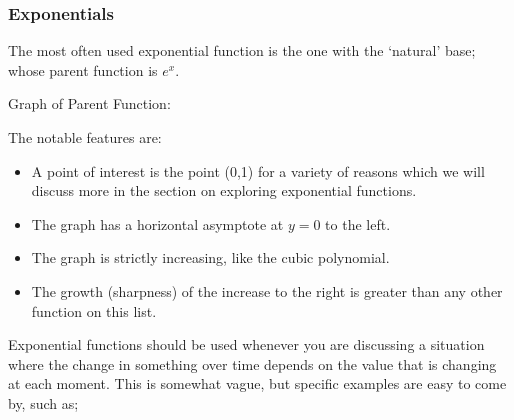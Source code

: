 \documentclass{ximeraXloud}
\begin{document}
    
    
    
    
    \subsubsection*{Exponentials}
    
        \begin{description}
            \item[Parent Function:] The most often used exponential function is the one with the `natural' base; whose parent function is $e^x$.\\
            \begin{minipage}{\textwidth}\item[Graph of Parent Function:]\hspace*{0pt} \\
                \begin{center}
                \end{center}
            \end{minipage}
            \item[Notable Features of Graph:] The notable features are:
            \begin{itemize}
                \item A point of interest is the point (0,1) for a variety of reasons which we will discuss more in the section on exploring exponential functions.
                \item The graph has a horizontal asymptote at $y=0$ to the left.
                \item The graph is strictly increasing, like the cubic polynomial.
                \item The growth (sharpness) of the increase to the right is greater than any other function on this list.
            \end{itemize}
            \item[Example usage:] Exponential functions should be used whenever you are discussing a situation where the change in something over time depends on the value that is changing at each moment. This is somewhat vague, but specific examples are easy to come by, such as;

\end{description}
\end{document}
